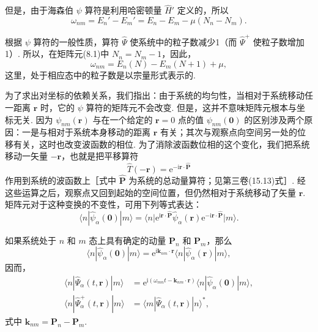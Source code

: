 但是，由于海森伯 $\psi$ 算符是利用哈密顿量 $\hat H'$ 定义的，所以
\begin{equation*}
\omega_{nm}=E_n'-E_m'=E_n-E_m-\mu(N_n-N_m).
\end{equation*}

根据 $\psi$ 算符的一般性质，算符 $\hat\Psi$ 使系统中的粒子数减少1（而 $\hat\Psi^{+}$ 使粒子数增加1）. 所以，在矩阵元(8.1)中 $N_n=N_m-1$，因此，
\begin{equation}
\omega_{nm}=E_n(N)-E_m(N+1)+\mu,
\end{equation}
这里，处于相应态中的粒子数是以宗量形式表示的.

为了求出对坐标的依赖关系，我们指出：由于系统的均匀性，当相对于系统移动任一距离 $\bm r$ 时，它的 $\psi$ 算符的矩阵元不会改变. 但是，这并不意味矩阵元根本与坐标无关. 因为 $\psi_{nm}(\bm r)$ 与在一个给定的 $\bm r=0$ 点的值 $\psi_{nm}(\bm 0)$ 的区别涉及两个原因：一是与相对于系统本身移动的距离 $\bm r$ 有关；其次与观察点向空间另一处的位移有关，这时也改变波函数的相位. 为了消除波函数位相的这个变化，我们把系统移动一矢量 $-\bm r$，也就是把平移算符
\begin{equation*}
\hat T(-\bm r)=\mathrm{e}^{-\mathrm{i}\bm r\cdot\hat{\bm P}}
\end{equation*}
作用到系统的波函数上［式中 $\hat{\bm P}$ 为系统的总动量算符；见第三卷(15.13)式］. 经这些运算之后，观察点又回到起始的空间位置，但仍然相对于系统移动了矢量 $\bm r$. 矩阵元对于这种变换的不变性，可用下列等式表达：
\begin{equation}
\langle n|\hat\psi_\alpha(\bm 0)|m\rangle=\big\langle n\big|\mathrm{e}^{\mathrm{i}\bm r\cdot\hat{\bm P}}\hat\psi_\alpha(\bm r)\mathrm{e}^{-\mathrm{i}\bm r\cdot\hat{\bm P}}\big|m\big\rangle.
\end{equation}

如果系统处于 $n$ 和 $m$ 态上具有确定的动量 $\bm P_n$ 和 $\bm P_m$，那么
\begin{equation*}
\langle n|\hat\psi_\alpha(\bm 0)|m\rangle=\mathrm{e}^{\mathrm{i}\bm k_{nm}\cdot\bm r}\langle n|\hat\psi_\alpha(\bm r)|m\rangle,
\end{equation*}
因而，
\begin{equation}
\begin{aligned}
\langle n|\hat\Psi_\alpha(t,\bm r)|m\rangle&=\mathrm{e}^{\mathrm{i}(\omega_{mn}t-\bm k_{nm}\cdot\bm r)}\langle n|\hat\psi_\alpha(\bm 0)|m\rangle,\\
\langle n|\hat\Psi^{+}_\alpha(t,\bm r)|m\rangle&=\langle m|\hat\Psi_\alpha(t,\bm r)|n\rangle^{*},
\end{aligned}
\end{equation}
式中 $\bm k_{nm}=\bm P_n-\bm P_m$.


